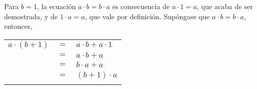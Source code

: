 \begin{enumerate}
\begin{center}
\begin{tabular}{rcl}
	      \end{tabular}
	  \end{center}
	  Para $b=1$, la ecuación $a\cdot b=b\cdot a$ es consecuencia de $a\cdot 1=a$, que acaba de ser demostrada, y de $1\cdot a = a$, que vale por definición. Supóngase que $a\cdot b=b\cdot a$, entonces,
	  \begin{center}
	      \begin{tabular}{rcl}
		  $a\cdot (b+1)$&$=$&$a\cdot b + a\cdot 1$\\
		  &$=$&$a\cdot b + a$\\
		  &$=$&$b\cdot a + a$\\
		  &$=$&$(b+1)\cdot a$\\\\
	      \end{tabular}
	  \end{center}


\end{enumerate}
